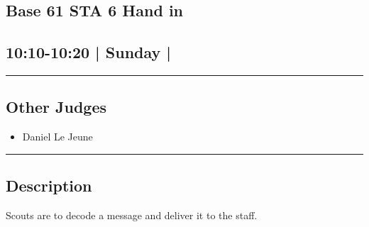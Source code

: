 \documentclass[10pt, A5]{article}
\begin{document}
		\begin{framed}
			\begin{minipage}{\textwidth}

			\setcounter{section}{97}
							\section{\faStar \: Base 61 \faStar \: STA 6 Hand in}
						
			\subsection*{10:10-10:20 | Sunday | }

			\vspace{0.25cm}
			\hrule
			\vspace{0.25cm}


			\subsection*{Other Judges}
							

				\begin{multicols}{2}

			\begin{itemize}
											\item Daniel Le Jeune
								\end{itemize}

			\vfill\null
			\columnbreak

			\begin{itemize}
								\end{itemize}

			\vfill\null

			\end{multicols}

			\vspace{0.25cm}
			\hrule
			\vspace{0.25cm}

			\begin{minipage}{\textwidth}
			\subsection*{\faListAlt \: Description}
			Scouts are to decode a message and deliver it to the staff.
			\end{minipage}


	\end{minipage}
	\end{framed}
\end{document}
